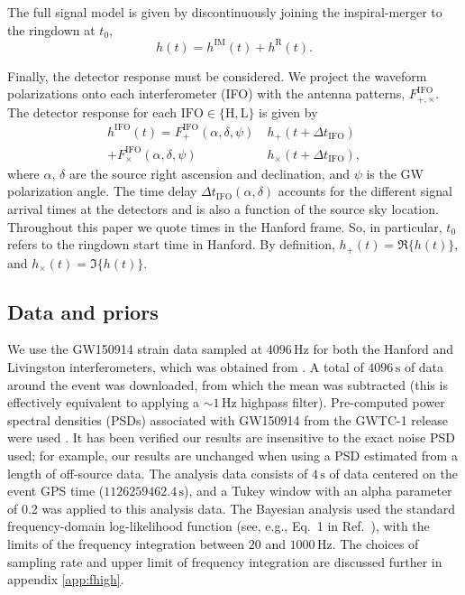 The full signal model is given by discontinuously joining the inspiral-merger to the ringdown at $t_0$,
\begin{equation}
	h(t) = h^\mathrm{IM}(t) + h^\mathrm{R}(t).
\end{equation}

Finally, the detector response must be considered.
We project the waveform polarizations onto each interferometer (IFO) with the antenna patterns, $F^\mathrm{IFO}_{+,\times}$.
The detector response for each ${\mathrm{IFO}\in \{\mathrm{H}, \mathrm{L}\}}$ is given by
\begin{align} \label{ch4:eq:projection_antenna}
	h^\mathrm{IFO}(t) = F^\mathrm{IFO}_+(\alpha, \delta, \psi) ~ &h_+(t + \Delta t_\mathrm{IFO}) \nonumber \\
	+ F^\mathrm{IFO}_\times(\alpha, \delta, \psi) ~ &h_\times(t + \Delta t_\mathrm{IFO}),
\end{align}
where $\alpha$, $\delta$ are the source right ascension and declination, and $\psi$ is the GW polarization angle.
The time delay $\Delta t_\mathrm{IFO}(\alpha, \delta)$ accounts for the different signal arrival times at the detectors and is also a function of the source sky location.
Throughout this paper we quote times in the Hanford frame.
So, in particular, $t_0$ refers to the ringdown start time in Hanford.
By definition, $h_+(t) = \Re\{ h(t) \}$, and $h_\times(t) = \Im \{ h(t) \}$.


\subsection{Data and priors}
\label{sec:details}

We use the GW150914 strain data sampled at $4096\, \mathrm{Hz}$ for both the Hanford and Livingston interferometers, which was obtained from \cite{gwosc, LIGOScientific:2019lzm}.
A total of $4096\,\mathrm{s}$ of data around the event was downloaded, from which the mean was subtracted (this is effectively equivalent to applying a $\sim 1\, \mathrm{Hz}$ highpass filter). 
Pre-computed power spectral densities (PSDs) associated with GW150914 from the GWTC-1 release were used \cite{gwtc1psds}. 
It has been verified our results are insensitive to the exact noise PSD used; for example, our results are unchanged when using a PSD estimated from a length of off-source data.
The analysis data consists of $4\,\mathrm{s}$ of data centered on the event GPS time ($1126259462.4\,\mathrm{s}$), and a Tukey window with an alpha parameter of 0.2 was applied to this analysis data.
The Bayesian analysis used the standard frequency-domain log-likelihood function (see, e.g., Eq.~1 in Ref.~\cite{Finch:2021qph}), with the limits of the frequency integration between $20$ and $1000\, \mathrm{Hz}$.
The choices of sampling rate and upper limit of frequency integration are discussed further in appendix \ref{app:fhigh}.

